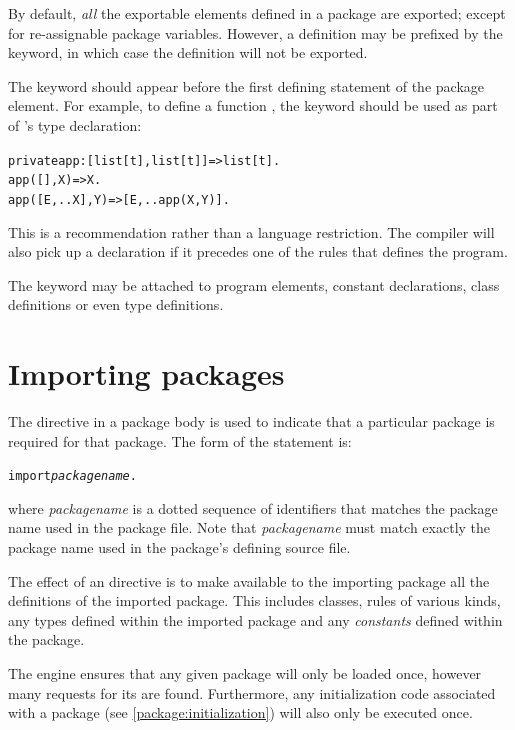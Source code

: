 By default, \emph{all} the exportable elements defined in a package are exported; except for re-assignable package variables. However, a definition may be prefixed by the  keyword, in which case the definition will not be exported.

The  keyword should appear before the first defining statement of the package element. For example, to define a  function , the  keyword should be used as part of 's type declaration:
\begin{alltt}
private app:[list[t],list[t]]=>list[t].
app([],X)=>X.
app([E,..X],Y)=>[E,..app(X,Y)].
\end{alltt}
\begin{aside}
This is a recommendation rather than a language restriction. The \go compiler will also pick up a  declaration if it precedes one of the rules that defines the program.
\end{aside}
The  keyword may be attached to program elements, constant declarations, class definitions or even type definitions.

\section{Importing packages}
\label{package:import}

The  directive in a package body is used to indicate that a particular package is required for that package. The form of the  statement is:
\begin{alltt}
import \emph{packagename}.
\end{alltt}
where \emph{packagename} is a dotted sequence of identifiers that matches the package name used in the package file. Note that \emph{packagename} must match exactly the package name used in the package's defining source file.

The effect of an  directive is to make available to the importing package all the definitions of the imported package. This includes classes, rules of various kinds, any types defined within the imported package and any \emph{constants} defined within the package.

The \go engine ensures that any given package will only be loaded once, however many requests for its  are found. Furthermore, any initialization code associated with a package (see \vref{package:initialization}) will also only be executed once.

